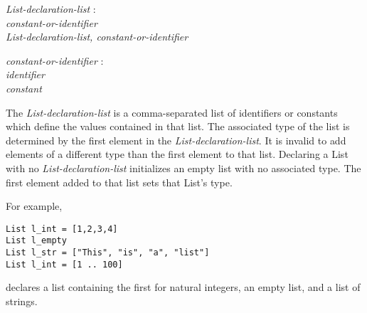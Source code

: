 \documentclass{article}
\begin{document}
\begin{tabbing}
	\= \emph{List}\=\emph{-declaration-list} : \\
		\> \> \emph{constant-or-identifier} \\
		\>\> \emph{List-declaration-list, constant-or-identifier}
\end{tabbing}
\begin{tabbing}
	\= \emph{const}\=\emph{ant-or-identifier} : \\
		\> \> \emph{identifier} \\
		\>\> \emph{constant}
\end{tabbing}

The \emph{List-declaration-list} is a comma-separated list of identifiers or constants which define the values contained in that list. The associated type of the list is determined by the first element in the \emph{List-declaration-list}. It is invalid to add elements of a different type than the first element to that list. Declaring a List with no \emph{List-declaration-list} initializes an empty list with no associated type. The first element added to that list sets that List's type. 

For example,
\begin{lstlisting}
List l_int = [1,2,3,4]
List l_empty
List l_str = ["This", "is", "a", "list"]
List l_int = [1 .. 100]
\end{lstlisting}
declares a list containing the first for natural integers, an empty list, and a list of strings.
\end{document}
